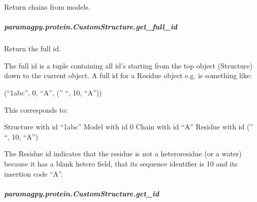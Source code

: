 \documentclass[a4paper,10pt,english,openany,oneside]{sphinxmanual}
\begin{document}
\begin{fulllineitems}
\begin{fulllineitems}
\begin{fulllineitems}
\label{\detokenize{reference/generated/paramagpy.protein.CustomStructure.get_chains:paramagpy.protein.CustomStructure.get_chains}}
\sphinxAtStartPar
Return chains from models.

\end{fulllineitems}



\subparagraph{paramagpy.protein.CustomStructure.get\_full\_id}
\label{\detokenize{reference/generated/paramagpy.protein.CustomStructure.get_full_id:paramagpy-protein-customstructure-get-full-id}}\label{\detokenize{reference/generated/paramagpy.protein.CustomStructure.get_full_id::doc}}

\begin{fulllineitems}
\label{\detokenize{reference/generated/paramagpy.protein.CustomStructure.get_full_id:paramagpy.protein.CustomStructure.get_full_id}}
\sphinxAtStartPar
Return the full id.

\sphinxAtStartPar
The full id is a tuple containing all id’s starting from
the top object (Structure) down to the current object. A full id for
a Residue object e.g. is something like:

\sphinxAtStartPar
(“1abc”, 0, “A”, (” “, 10, “A”))

\sphinxAtStartPar
This corresponds to:

\sphinxAtStartPar
Structure with id “1abc”
Model with id 0
Chain with id “A”
Residue with id (” “, 10, “A”)

\sphinxAtStartPar
The Residue id indicates that the residue is not a hetero\sphinxhyphen{}residue
(or a water) because it has a blank hetero field, that its sequence
identifier is 10 and its insertion code “A”.

\end{fulllineitems}



\subparagraph{paramagpy.protein.CustomStructure.get\_id}
\label{\detokenize{reference/generated/paramagpy.protein.CustomStructure.get_id:paramagpy-protein-customstructure-get-id}}\label{\detokenize{reference/generated/paramagpy.protein.CustomStructure.get_id::doc}}


\end{fulllineitems}
\end{fulllineitems}
\end{document}
